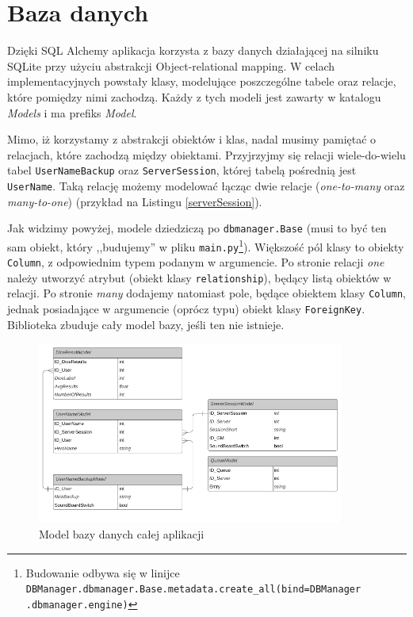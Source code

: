 \documentclass[shortabstract,inz]{iithesis}
\begin{document}
		\section{Baza danych}
		Dzięki SQL Alchemy aplikacja korzysta z bazy danych działającej na silniku SQLite przy użyciu abstrakcji Object-relational mapping. W celach implementacyjnych powstały klasy, modelujące poszczególne tabele oraz relacje, które pomiędzy nimi zachodzą. Każdy z tych modeli jest zawarty w katalogu \textit{Models} i ma prefiks \textit{Model}.
		
		Mimo, iż korzystamy z abstrakcji obiektów i klas, nadal musimy pamiętać o relacjach, które zachodzą między obiektami. Przyjrzyjmy się relacji wiele-do-wielu tabel \texttt{UserNameBackup} oraz \texttt{ServerSession}, której tabelą pośrednią jest \texttt{UserName}. Taką relację możemy modelować łącząc dwie relacje (\textit{one-to-many} oraz \textit{many-to-one}) (przykład na Listingu \ref{serverSession}).
		
		
		
		Jak widzimy powyżej, modele dziedziczą po \texttt{dbmanager.Base} (musi to być ten sam obiekt, który ,,budujemy'' w pliku \texttt{main.py}\footnote{Budowanie odbywa się w linijce \texttt{DBManager.dbmanager.Base.metadata.create\_all(bind=DBManager
				.dbmanager.engine)}}). Większość pól klasy to obiekty \texttt{Column}, z odpowiednim typem podanym w argumencie. Po stronie relacji \textit{one} należy utworzyć atrybut (obiekt klasy \texttt{relationship}), będący listą obiektów w relacji. Po stronie \textit{many} dodajemy natomiast pole, będące obiektem klasy \texttt{Column}, jednak posiadające w argumencie (oprócz typu) obiekt klasy \texttt{ForeignKey}. Biblioteka zbuduje cały model bazy, jeśli ten nie istnieje.
		
		

		\begin{figure}[h!]
			\centering
			\includegraphics[width=0.90\textwidth]{dbmodels}
			\caption{Model bazy danych całej aplikacji}
		\end{figure}
	
\end{document}
